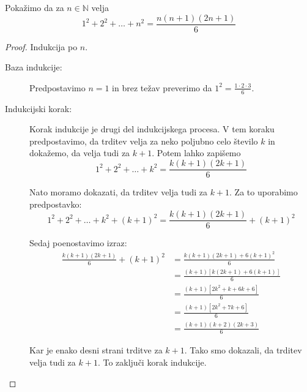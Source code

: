 \documentclass[11pt,paper=b5,footinclude,headinclude]{scrbook} %
\newcounter{example}
\begin{document}
\begin{center}
\end{center}
\begin{example*}
    Pokažimo da za $n\in\mathbb N$ velja 
    $$1^2 + 2^2 + \ldots + n^2 = \frac{n(n+1)(2n+1)}{6}$$
\begin{proof}
    Indukcija po $n$. 
    \begin{description}
        \item[Baza  indukcije:] Predpostavimo  $n=1$ in brez  težav  preverimo da $1^2=\frac{1\cdot 2\cdot 3}{6}$.
        \item[Indukcijski korak:]
        Korak indukcije je drugi del indukcijskega procesa. V tem koraku predpostavimo, da trditev velja za neko poljubno celo število $k$ in dokažemo, da velja tudi za $k+1$.
        Potem lahko  zapišemo
\[
1^2 + 2^2 + \ldots + k^2 = \frac{k(k+1)(2k+1)}{6}
\]

Nato moramo dokazati, da trditev velja tudi za $k+1$. Za to uporabimo predpostavko:
\[
1^2 + 2^2 + \ldots + k^2 + (k+1)^2 = \frac{k(k+1)(2k+1)}{6} + (k+1)^2
\]

Sedaj poenostavimo izraz:
\begin{align*}
\frac{k(k+1)(2k+1)}{6} + (k+1)^2 &= \frac{k(k+1)(2k+1) + 6(k+1)^2}{6}\\
 &= \frac{(k+1)[k(2k+1) + 6(k+1)]}{6}\\
 &= \frac{(k+1)[2k^2+k+6k+6]}{6}\\
 &= \frac{(k+1)[2k^2+7k+6]}{6}\\
 &= \frac{(k+1)(k+2)(2k+3)}{6}
\end{align*}

Kar je enako desni strani trditve za $k+1$. Tako smo dokazali, da trditev velja tudi za $k+1$. To zaključi korak indukcije.
    \end{description}
\end{proof}

\end{example*}
\end{document}

